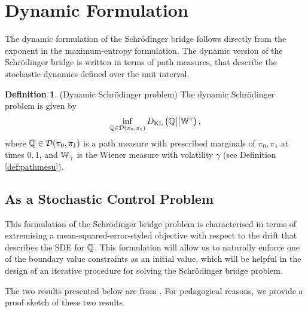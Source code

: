 \documentclass[a4paper,12pt,twoside,openright]{report}
\theoremstyle{definition}
\newtheorem{definition}{Definition}[section]
\begin{document}
\section{Dynamic Formulation}
The dynamic formulation of the Schrödinger bridge follows directly from the exponent in the maximum-entropy formulation. The dynamic version of the Schrödinger bridge is written in terms of path measures, that describe the stochastic dynamics defined over the unit interval.
\begin{definition}
    (Dynamic Schrödinger problem) The dynamic Schrödinger problem is given by
    \begin{align}
        \inf_{{\mathbb{Q}} \in {\mathcal{D}}(\pi_0, \pi_1)} D_{\mathrm{KL}}\left({\mathbb{Q}} \big|\big| \mathbb{W}^{\gamma}\right),
    \end{align}
    where ${\mathbb{Q}} \in {\mathcal{D}}(\pi_0, \pi_1)$ is a path measure with prescribed marginals of $\pi_0, \pi_1$ at times $0, 1$, and $\mathbb{W}_{\gamma}$ is the Wiener measure with volatility $\gamma$ (see Definition \ref{def:pathmesu}). 
\end{definition}
\subsection{As a Stochastic Control Problem}

This formulation of the Schrödinger bridge problem is characterised in terms of extremising a mean-squared-error-styled objective with respect to the drift that describes the SDE for ${\mathbb{Q}}$. This formulation will allow us to naturally enforce one of the boundary value constraints as an initial value, which will be helpful in the design of an iterative procedure for solving the Schrödinger bridge problem.

The two results presented below are from \cite{pavon1991free}. For pedagogical reasons, we provide a proof sketch of these two results.
\end{document}
